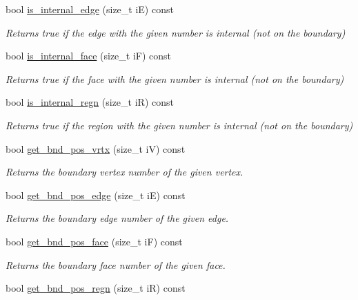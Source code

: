 \begin{DoxyCompactItemize}
bool \hyperlink{classStemMesh3D_1_1mesh__3Dv_ae4e6b4995cb4169fdb930a508d0b83de}{is\+\_\+internal\+\_\+edge} (size\+\_\+t iE) const
\begin{DoxyCompactList}\small\item\em Returns true if the edge with the given number is internal (not on the boundary) \end{DoxyCompactList}\item 
bool \hyperlink{classStemMesh3D_1_1mesh__3Dv_a7ec74c519a65b29f52e243e4905b687d}{is\+\_\+internal\+\_\+face} (size\+\_\+t iF) const
\begin{DoxyCompactList}\small\item\em Returns true if the face with the given number is internal (not on the boundary) \end{DoxyCompactList}\item 
bool \hyperlink{classStemMesh3D_1_1mesh__3Dv_adaeed2f2444ec1db2b5bcc380eb38d15}{is\+\_\+internal\+\_\+regn} (size\+\_\+t iR) const
\begin{DoxyCompactList}\small\item\em Returns true if the region with the given number is internal (not on the boundary) \end{DoxyCompactList}\item 
bool \hyperlink{classStemMesh3D_1_1mesh__3Dv_ae52d0ac704be160984e7ef7bfde79758}{get\+\_\+bnd\+\_\+pos\+\_\+vrtx} (size\+\_\+t iV) const
\begin{DoxyCompactList}\small\item\em Returns the boundary vertex number of the given vertex. \end{DoxyCompactList}\item 
bool \hyperlink{classStemMesh3D_1_1mesh__3Dv_a6d613200a8b1f52a99536d7178984ab9}{get\+\_\+bnd\+\_\+pos\+\_\+edge} (size\+\_\+t iE) const
\begin{DoxyCompactList}\small\item\em Returns the boundary edge number of the given edge. \end{DoxyCompactList}\item 
bool \hyperlink{classStemMesh3D_1_1mesh__3Dv_a862e96e989afcfb4f32f50f6e3096740}{get\+\_\+bnd\+\_\+pos\+\_\+face} (size\+\_\+t iF) const
\begin{DoxyCompactList}\small\item\em Returns the boundary face number of the given face. \end{DoxyCompactList}\item 
bool \hyperlink{classStemMesh3D_1_1mesh__3Dv_a39cd8935fe64cca4d649ded1bdb073ea}{get\+\_\+bnd\+\_\+pos\+\_\+regn} (size\+\_\+t iR) const

\end{DoxyCompactItemize}
